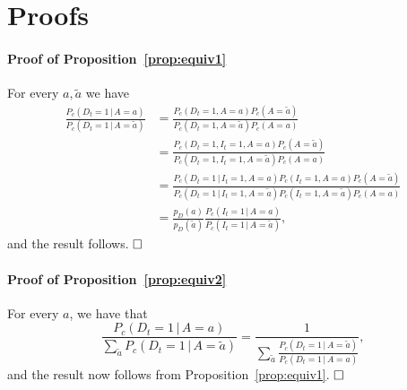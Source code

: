 \documentclass[a4paper]{article}
\newcommand{\given}{\, \vert \,}
\begin{document}
\appendix

\section{Proofs}

\paragraph{Proof of Proposition~\ref{prop:equiv1}}
For every $a, \tilde{a}$ we have 
\begin{align*}
\frac{P_c(D_t = 1\,|\,A = a)}
{P_c(D_t = 1\,|\, A = \tilde{a})} 
&= 
\frac{
P_c(D_t = 1,A = a)
P_c(A = \tilde{a})}
{P_c(D_t = 1, A = \tilde{a})P_c(A = a)}  \\
&= 
\frac{
P_c(D_t = 1,I_t = 1, A = a)P_c(A = \tilde{a})}
{P_c(D_t = 1,I_t = 1, A = \tilde{a})P_c(A = a)} \\
&= 
\frac{
P_c(D_t = 1\,|\,I_t = 1, A = a)P_c(I_t = 1,A = a)P_c(A = \tilde{a})}
{P_c(D_t = 1\,|\,I_t = 1, A = \tilde{a})P_c(I_t = 1,A = \tilde{a})P_c(A = a)} \\
&= 
\frac{p_D(a)}{p_D(\tilde{a})}  \frac{P_c(I_t = 1\,|\,A = a)}{P_c(I_t = 1\,|\,A = \tilde{a})} ,
\end{align*}
and the result follows. $\hfill \square$

\paragraph{Proof of Proposition~\ref{prop:equiv2}}
For every $a$, we have that 
\begin{equation*} 
\frac{P_c(D_t = 1 \given A = a)}
{\sum_{\tilde{a}} P_c(D_t = 1 \given A = \tilde{a})}
= 
\frac{1}{\sum_{\tilde{a}} \frac{P_c(D_t = 1\,|\,A = \tilde{a})}{P_c(D_t = 1\,|\,A = a)}},
\end{equation*}
and the result now follows from Proposition~\ref{prop:equiv1}. $\hfill \square$
\end{document}
